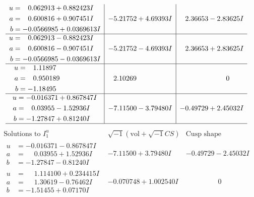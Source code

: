 \documentclass[1p]{elsarticle_modified}
\theoremstyle{definition}
\newcommand{\I}{\sqrt{-1}}
\begin{document}
$$\begin{array}{c|c|c}
\begin{aligned}
u &= \phantom{-}0.062913 + 0.882423 I \\
a &= \phantom{-}0.600816 + 0.907451 I \\
b &= -0.0566985 + 0.0369613 I\end{aligned}
 & -5.21752 + 4.69393 I & \phantom{-}2.36653 - 2.83625 I \\ \hline\begin{aligned}
u &= \phantom{-}0.062913 - 0.882423 I \\
a &= \phantom{-}0.600816 - 0.907451 I \\
b &= -0.0566985 - 0.0369613 I\end{aligned}
 & -5.21752 - 4.69393 I & \phantom{-}2.36653 + 2.83625 I \\ \hline\begin{aligned}
u &= \phantom{-}1.11897\phantom{ +0.000000I} \\
a &= \phantom{-}0.950189\phantom{ +0.000000I} \\
b &= -1.18495\phantom{ +0.000000I}\end{aligned}
 & \phantom{-}2.10269\phantom{ +0.000000I} & \phantom{-0.000000 } 0 \\ \hline\begin{aligned}
u &= -0.016371 + 0.867847 I \\
a &= \phantom{-}0.03955 - 1.52936 I \\
b &= -1.27847 + 0.81240 I\end{aligned}
 & -7.11500 - 3.79480 I & -0.49729 + 2.45032 I\\
 \hline 
 \end{array}$$\newpage$$\begin{array}{c|c|c}  
\text{Solutions to }I^u_{1}& \I (\text{vol} + \sqrt{-1}CS) & \text{Cusp shape}\\
 \hline 
\begin{aligned}
u &= -0.016371 - 0.867847 I \\
a &= \phantom{-}0.03955 + 1.52936 I \\
b &= -1.27847 - 0.81240 I\end{aligned}
 & -7.11500 + 3.79480 I & -0.49729 - 2.45032 I \\ \hline\begin{aligned}
u &= \phantom{-}1.114100 + 0.234415 I \\
a &= \phantom{-}1.30619 - 0.76462 I \\
b &= -1.51455 + 0.07170 I\end{aligned}
 & -0.070748 + 1.002540 I & \phantom{-0.000000 } 0 \\ \hline\begin{aligned}

\end{aligned}
\end{array}$$
\end{document}
